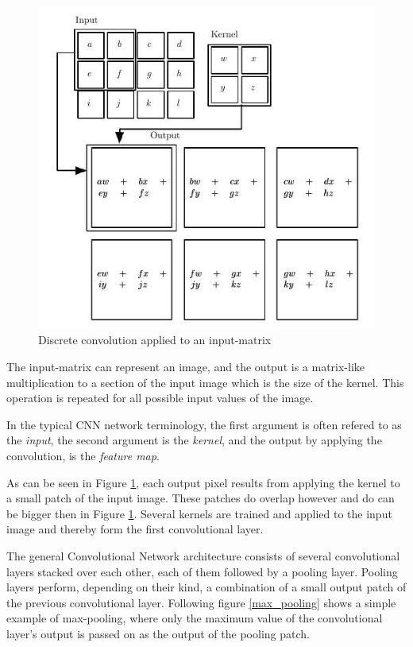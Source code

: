 \documentclass[	DIV=calc,%
				paper=a4,%
				fontsize=11pt,%
				twocolumn]{scrartcl}	 %
\begin{document}
\begin{figure}[H]
    \centering
    \includegraphics[width=.9\linewidth]{data/2d_cnn.png}
    \caption{Discrete convolution applied to an input-matrix \cite{Goodfellow-et-al-2016-Book}}
    \label{2d_cnn}
\end{figure}

The input-matrix can represent an image, and the output is a matrix-like multiplication to a section of the input image which is the size of the kernel. This operation is repeated for all possible input values of the image.

In the typical CNN network terminology, the first argument is often refered to as the \textit{input}, the second argument is the \textit{kernel}, and the output by applying the convolution, is the \textit{feature map}.

As can be seen in Figure \ref{2d_cnn}, each output pixel results from applying the kernel to a small patch of the input image. These patches do overlap however and do can be bigger then in Figure \ref{2d_cnn}. Several kernels are trained and applied to the input image and thereby form the first convolutional layer.

The general Convolutional Network architecture consists of several convolutional layers stacked over each other, each of them followed by a pooling layer. Pooling layers perform, depending on their kind, a combination of a small output patch of the previous convolutional layer. Following figure \ref{max_pooling} shows a simple example of max-pooling, where only the maximum value of the convolutional layer's output is passed on as the output of the pooling patch.
\end{document}
